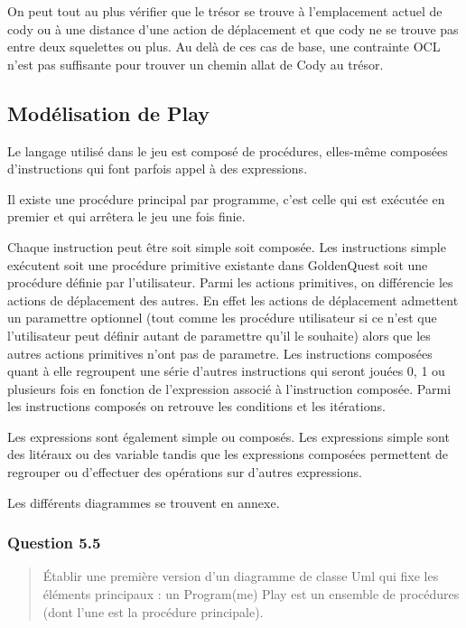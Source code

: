 \documentclass[]{article}
\begin{document}
On peut tout au plus vérifier que le trésor se trouve à l'emplacement
actuel de cody ou à une distance d'une action de déplacement et que cody
ne se trouve pas entre deux squelettes ou plus. Au delà de ces cas de
base, une contrainte OCL n'est pas suffisante pour trouver un chemin
allat de Cody au trésor.

\hypertarget{moduxe9lisation-de-play}{%
\subsection{Modélisation de Play}\label{moduxe9lisation-de-play}}

Le langage utilisé dans le jeu est composé de procédures, elles-même
composées d'instructions qui font parfois appel à des expressions.

Il existe une procédure principal par programme, c'est celle qui est
exécutée en premier et qui arrêtera le jeu une fois finie.

Chaque instruction peut être soit simple soit composée. Les instructions
simple exécutent soit une procédure primitive existante dans GoldenQuest
soit une procédure définie par l'utilisateur. Parmi les actions
primitives, on différencie les actions de déplacement des autres. En
effet les actions de déplacement admettent un paramettre optionnel (tout
comme les procédure utilisateur si ce n'est que l'utilisateur peut
définir autant de paramettre qu'il le souhaite) alors que les autres
actions primitives n'ont pas de parametre. Les instructions composées
quant à elle regroupent une série d'autres instructions qui seront
jouées 0, 1 ou plusieurs fois en fonction de l'expression associé à
l'instruction composée. Parmi les instructions composés on retrouve les
conditions et les itérations.

Les expressions sont également simple ou composés. Les expressions
simple sont des litéraux ou des variable tandis que les expressions
composées permettent de regrouper ou d'effectuer des opérations sur
d'autres expressions.

Les différents diagrammes se trouvent en annexe.

\hypertarget{question-5.5}{%
\subsubsection{Question 5.5}\label{question-5.5}}

\begin{quote}
Établir une première version d'un diagramme de classe Uml qui fixe les
éléments principaux : un Program(me) Play est un ensemble de procédures
(dont l'une est la procédure principale).
\end{quote}
\end{document}
